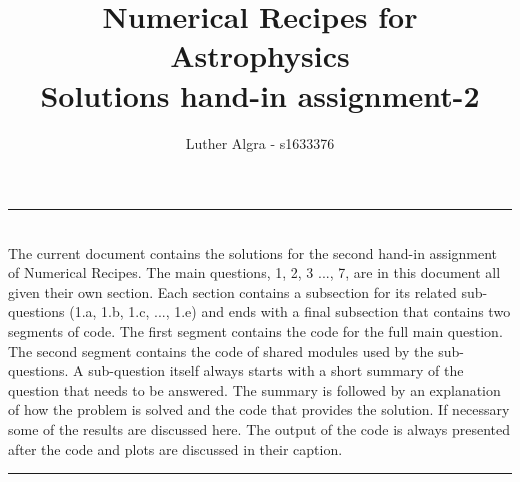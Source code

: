 \documentclass[a4paper,10pt]{article}
\title{\vspace{-1cm}\textbf{Numerical Recipes for Astrophysics \\ Solutions hand-in assignment-2}}
\author{Luther Algra - s1633376}
\renewenvironment{abstract}
 { \vspace*{0.3cm} \textbf{\abstractname} \vspace{0.1cm} \\ \ignorespaces}
 {\par\medskip \vspace{0.1cm}}
\begin{document}
\maketitle
\hrule
\begin{abstract}
The current document contains the solutions for the second hand-in assignment of Numerical Recipes. The main questions, 1, 2, 3 ..., 7, are in this document all given their own section. Each section contains a subsection for its related sub-questions (1.a, 1.b, 1.c, ..., 1.e) and ends with a final subsection that contains two segments of code. The first segment contains the code for the full main question. The second segment contains the code of shared modules used by the sub-questions. A sub-question itself always starts with a short summary of the question that needs to be answered. The summary is followed by an explanation of how the problem is solved and the code that provides the solution. If necessary some of the results are discussed here. The output of the code is always presented after the code and plots are discussed in their caption.


\end{abstract}
\hrule
\vspace{0.5cm}




























%


%





  
\end{document}
